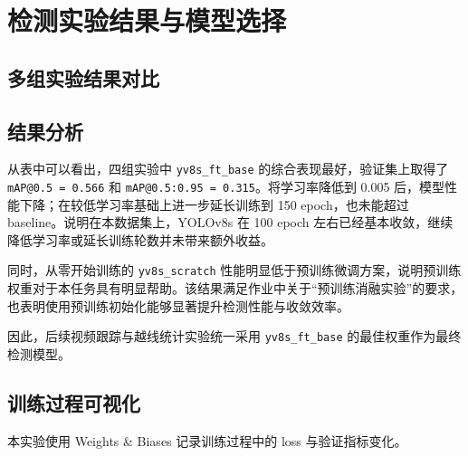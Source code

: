 \documentclass[UTF8,a4paper,12pt,fontset=fandol]{ctexart}
\begin{document}
\section{检测实验结果与模型选择}

\subsection{多组实验结果对比}
\begin{table}[H]
\centering
\caption{不同训练设置下的验证集性能对比}
\end{table}

\subsection{结果分析}
从表中可以看出，四组实验中 \texttt{yv8s\_ft\_base} 的综合表现最好，验证集上取得了 \texttt{mAP@0.5 = 0.566} 和 \texttt{mAP@0.5:0.95 = 0.315}。将学习率降低到 0.005 后，模型性能下降；在较低学习率基础上进一步延长训练到 150 epoch，也未能超过 baseline。说明在本数据集上，YOLOv8s 在 100 epoch 左右已经基本收敛，继续降低学习率或延长训练轮数并未带来额外收益。

同时，从零开始训练的 \texttt{yv8s\_scratch} 性能明显低于预训练微调方案，说明预训练权重对于本任务具有明显帮助。该结果满足作业中关于“预训练消融实验”的要求，也表明使用预训练初始化能够显著提升检测性能与收敛效率。

因此，后续视频跟踪与越线统计实验统一采用 \texttt{yv8s\_ft\_base} 的最佳权重作为最终检测模型。

\subsection{训练过程可视化}
本实验使用 Weights \& Biases 记录训练过程中的 loss 与验证指标变化。
\end{document}

